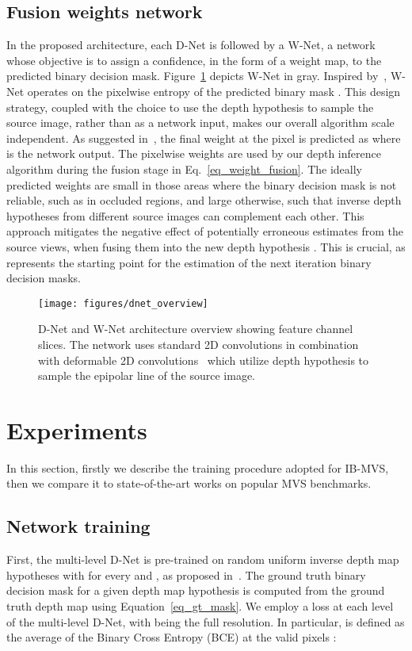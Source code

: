 \documentclass{bmvc2k}
\begin{document}
\subsection{Fusion weights network}
In the proposed architecture, each D-Net is followed by a W-Net, a network whose objective is to assign a confidence, in the form of a weight map, to the predicted binary decision mask.
Figure~\ref{fig_dnet_overview} depicts W-Net in gray.
Inspired by~\cite{vismvsnet}, W-Net operates on the pixelwise entropy of the predicted binary mask .
This design strategy, coupled with the choice to use the depth hypothesis to sample the source image, rather than as a network input, makes our overall algorithm scale independent.
As suggested in~\cite{vismvsnet}, the final weight at the pixel  is predicted as  where  is the network output.
The pixelwise weights are used by our depth inference algorithm during the fusion stage in Eq.~\eqref{eq_weight_fusion}.
The ideally predicted weights are small in those areas where the binary decision mask is not reliable, such as in occluded regions, and large otherwise, such that inverse depth hypotheses from different source images can complement each other.
This approach mitigates the negative effect of potentially erroneous estimates  from the source views, when fusing them into the new depth hypothesis .
This is crucial, as  represents the starting point for the estimation of the next iteration binary decision masks. 
\begin{figure}[t]
\centering
\texttt{[image: figures/dnet\_overview]}
\caption{
D-Net and W-Net architecture overview showing feature channel slices.
The network uses standard 2D convolutions in combination with deformable 2D convolutions~\cite{deform_convsv2} which utilize depth hypothesis  to sample the epipolar line of the source image.
\vspace{-10pt}
}
\label{fig_dnet_overview}
\end{figure}
\vspace{-1em}
\section{Experiments}
In this section, firstly we describe the training procedure adopted for IB-MVS, then we compare it to state-of-the-art works on popular MVS benchmarks.
\subsection{Network training} \label{sec_network_train}
First, the multi-level D-Net is pre-trained on random uniform inverse depth map hypotheses with  for every  and , as proposed in~\cite{bi3d_stereo}.
The ground truth binary decision mask  for a given depth map hypothesis  is computed from the ground truth depth map  using Equation~\eqref{eq_gt_mask}.
We employ a loss  at each level  of the multi-level D-Net, with  being the full resolution.
In particular,  is defined as the average of the Binary Cross Entropy (BCE) at the valid pixels :
\vspace{-10pt}
 
\end{document}
